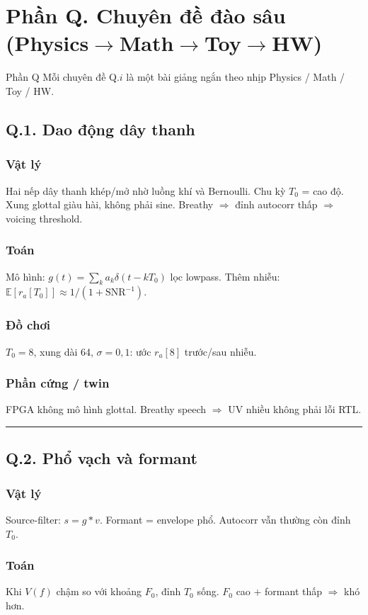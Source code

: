 \section*{Phần Q. Chuyên đề đào sâu (Physics$\to$Math$\to$Toy$\to$HW)}
\begin{firstprin}{Phần Q}
Mỗi chuyên đề Q.$i$ là một bài giảng ngắn theo nhịp Physics / Math / Toy / HW.
\end{firstprin}
\subsection*{Q.1. Dao động dây thanh}
\subsubsection*{Vật lý}
Hai nếp dây thanh khép/mở nhờ luồng khí và Bernoulli. Chu kỳ $T_0$ = cao độ. Xung glottal giàu hài, không phải sine. Breathy $\Rightarrow$ đỉnh autocorr thấp $\Rightarrow$ voicing threshold.
\subsubsection*{Toán}
Mô hình: $g(t)=\sum_k a_k \delta(t-kT_0)$ lọc lowpass. Thêm nhiễu: $\mathbb{E}[r_a[T_0]]\approx 1/(1+\mathrm{SNR}^{-1})$.
\subsubsection*{Đồ chơi}
$T_0=8$, xung dài 64, $\sigma=0{,}1$: ước $r_a[8]$ trước/sau nhiễu.
\subsubsection*{Phần cứng / twin}
FPGA không mô hình glottal. Breathy speech $\Rightarrow$ UV nhiều không phải lỗi RTL.
\vspace{0.25cm}\hrule\vspace{0.25cm}
\subsection*{Q.2. Phổ vạch và formant}
\subsubsection*{Vật lý}
Source-filter: $s=g*v$. Formant = envelope phổ. Autocorr vẫn thường còn đỉnh $T_0$.
\subsubsection*{Toán}
Khi $V(f)$ chậm so với khoảng $F_0$, đỉnh $T_0$ sống. $F_0$ cao + formant thấp $\Rightarrow$ khó hơn.
